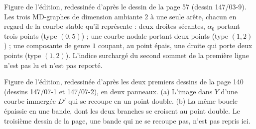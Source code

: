 \documentclass[11pt,a4paper]{article}
\newcommand{\legende}[1]{{\centering\small\color{gray!60!black}#1\par}\medskip}
\newcommand{\cote}[2]{\par\smallskip\noindent{\small\textbf{Cote #1, page #2.}}\par\nopagebreak}
\begin{document}
\legende{Figure de l'édition, redessinée d'après le dessin de la page 57
(dessin 147/03-9). Les trois MD-graphes de dimension ambiante $2$ à une seule
arête, chacun en regard de la courbe stable qu'il représente : deux droites
sécantes, $\alpha_0$ portant trois points (type $(0, 5)$) ; une courbe nodale
portant deux points (type $(1, 2)$) ; une composante de genre $1$ coupant, au
point épais, une droite qui porte deux points (type $(1, 2)$). L'indice
surchargé du second sommet de la première ligne n'est pas lu et n'est pas
reporté.}

\cote{147}{140}
\begin{center}
\end{center}
\legende{Figure de l'édition, redessinée d'après les deux premiers dessins de
la page 140 (dessins 147/07-1 et 147/07-2), en deux panneaux. (a) L'image dans
$Y$ d'une courbe immergée $D'$ qui se recoupe en un point double. (b) La même
boucle épaissie en une bande, dont les deux branches se croisent au point
double. Le troisième dessin de la page, une bande qui ne se recoupe pas, n'est
pas repris ici.}
\end{document}
